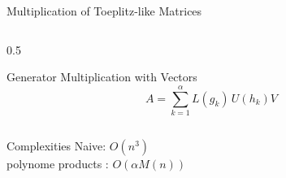 \begin{frame}{Multiplication of Toeplitz-like Matrices}
  \begin{columns}
    \begin{column}{0.5\textwidth}
      \begin{block}{Generator Multiplication with Vectors}
        \[
           A = \sum_{k=1}^{\alpha} L(g_k)\, U(h_k) V
        \]
      \end{block}
    \end{column}
  \end{columns}
  \vspace{1em}
    \begin{block}{Complexities}
    Naive: $O(n^3)$           \\
    polynome products : $O(\alpha M(n))$
  \end{block}
\end{frame}
